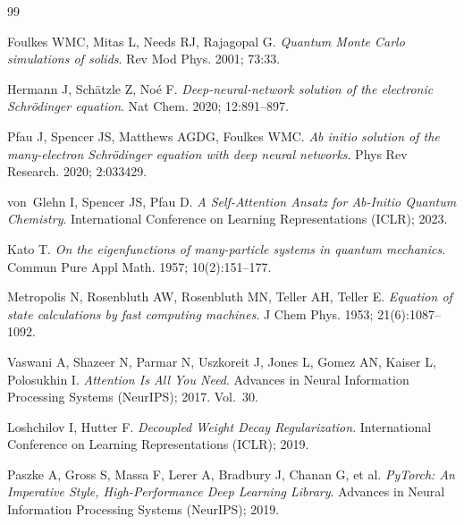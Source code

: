 \begin{thebibliography}{99}

Foulkes WMC, Mitas L, Needs RJ, Rajagopal G.
\newblock \emph{Quantum Monte Carlo simulations of solids}.
\newblock Rev Mod Phys. 2001; 73:33.

Hermann J, Sch{\"a}tzle Z, No{\'e} F.
\newblock \emph{Deep-neural-network solution of the electronic Schr{\"o}dinger equation}.
\newblock Nat Chem. 2020; 12:891--897.

Pfau J, Spencer JS, Matthews AGDG, Foulkes WMC.
\newblock \emph{Ab initio solution of the many-electron Schr{\"o}dinger equation with deep neural networks}.
\newblock Phys Rev Research. 2020; 2:033429.

von~Glehn I, Spencer JS, Pfau D.
\newblock \emph{A Self-Attention Ansatz for Ab-Initio Quantum Chemistry}.
\newblock International Conference on Learning Representations (ICLR); 2023.

Kato T.
\newblock \emph{On the eigenfunctions of many-particle systems in quantum mechanics}.
\newblock Commun Pure Appl Math. 1957; 10(2):151--177.

Metropolis N, Rosenbluth AW, Rosenbluth MN, Teller AH, Teller E.
\newblock \emph{Equation of state calculations by fast computing machines}.
\newblock J Chem Phys. 1953; 21(6):1087--1092.

Vaswani A, Shazeer N, Parmar N, Uszkoreit J, Jones L, Gomez AN, Kaiser L, Polosukhin I.
\newblock \emph{Attention Is All You Need}.
\newblock Advances in Neural Information Processing Systems (NeurIPS); 2017. Vol.~30.

Loshchilov I, Hutter F.
\newblock \emph{Decoupled Weight Decay Regularization}.
\newblock International Conference on Learning Representations (ICLR); 2019.

Paszke A, Gross S, Massa F, Lerer A, Bradbury J, Chanan G, et al.
\newblock \emph{PyTorch: An Imperative Style, High-Performance Deep Learning Library}.
\newblock Advances in Neural Information Processing Systems (NeurIPS); 2019.

\end{thebibliography}


